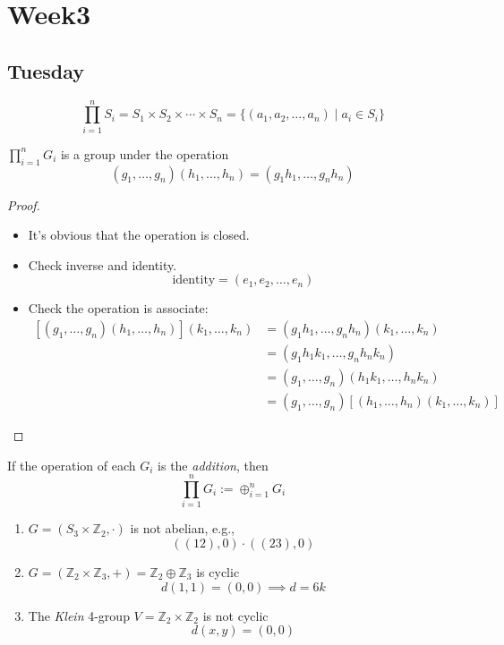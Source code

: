 
\chapter{Week3}

\section{Tuesday}
\begin{definition}
\[
\prod_{i=1}^nS_i=S_1\times S_2\times\cdots\times S_n
=
\{
(a_1,a_2,\dots,a_n)\mid a_i\in S_i
\}
\]
\end{definition}
\begin{theorem}
$\prod_{i=1}^nG_i$ is a group under the operation
\[
(g_1,\dots,g_n)(h_1,\dots,h_n)=(g_1h_1,\dots,g_nh_n)
\]
\end{theorem}
\begin{proof}
\begin{itemize}
\item
It's obvious that the operation is closed.
\item
Check inverse and identity.
\[
\mbox{identity} = (e_1,e_2,\dots,e_n)
\]
\item
Check the operation is associate:
\begin{align*}
\left[(g_1,\dots,g_n)(h_1,\dots,h_n)\right](k_1,\dots,k_n)&=(g_1h_1,\dots,g_nh_n)(k_1,\dots,k_n)\\
&=(g_1h_1k_1,\dots,g_nh_nk_n)\\
&=(g_1,\dots,g_n)(h_1k_1,\dots,h_nk_n)\\
&=(g_1,\dots,g_n)\left[(h_1,\dots,h_n)(k_1,\dots,k_n)\right]
\end{align*}
\end{itemize}
\end{proof}
\begin{remark}
If the operation of each $G_i$ is the \emph{addition}, then 
\[
\prod_{i=1}^nG_i:=\oplus_{i=1}^nG_i
\]
\end{remark}
\begin{example}
\begin{enumerate}
\item
$G=(S_3\times\mathbb{Z}_2,\cdot)$ is not abelian, e.g.,
\[
((12),0)\cdot((23),0)
\]
\item
$G=(\mathbb{Z}_2\times\mathbb{Z}_3,+)=\mathbb{Z}_2\oplus\mathbb{Z}_3$ is cyclic
\[
d(1,1) = (0,0)\implies d=6k
\]
\item
The \emph{Klein} 4-group $V=\mathbb{Z}_2\times\mathbb{Z}_2$ is not cyclic
\[
d(x,y) = (0,0)
\]
\end{enumerate}
\end{example}
